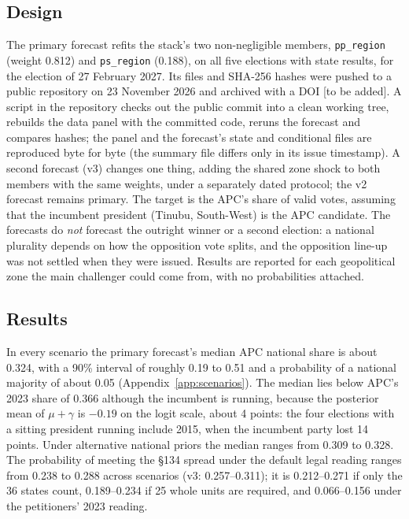 \documentclass[preprint,12pt,authoryear]{elsarticle}
\begin{document}
\subsection{Design}
\sloppy The primary forecast refits the stack's two non-negligible members, \texttt{pp\_region} (weight 0.812) and \texttt{ps\_region} (0.188), on all five elections with state results, for the election of 27 February 2027. Its files and SHA-256 hashes were pushed to a public repository on 23 November 2026 and archived with a DOI [to be added]. A script in the repository checks out the public commit into a clean working tree, rebuilds the data panel with the committed code, reruns the forecast and compares hashes; the panel and the forecast's state and conditional files are reproduced byte for byte (the summary file differs only in its issue timestamp). A second forecast (v3) changes one thing, adding the shared zone shock to both members with the same weights, under a separately dated protocol; the v2 forecast remains primary. The target is the APC's share of valid votes, assuming that the incumbent president (Tinubu, South-West) is the APC candidate. The forecasts do \emph{not} forecast the outright winner or a second election: a national plurality depends on how the opposition vote splits, and the opposition line-up was not settled when they were issued. Results are reported for each geopolitical zone the main challenger could come from, with no probabilities attached.

\subsection{Results}
In every scenario the primary forecast's median APC national share is about 0.324, with a 90\% interval of roughly 0.19 to 0.51 and a probability of a national majority of about 0.05 (Appendix~\ref{app:scenarios}). The median lies below APC's 2023 share of 0.366 although the incumbent is running, because the posterior mean of $\mu + \gamma$ is $-0.19$ on the logit scale, about 4 points: the four elections with a sitting president running include 2015, when the incumbent party lost 14 points. Under alternative national priors the median ranges from 0.309 to 0.328. The probability of meeting the \S134 spread under the default legal reading ranges from 0.238 to 0.288 across scenarios (v3: 0.257--0.311); it is 0.212--0.271 if only the 36 states count, 0.189--0.234 if 25 whole units are required, and 0.066--0.156 under the petitioners' 2023 reading.
\end{document}
